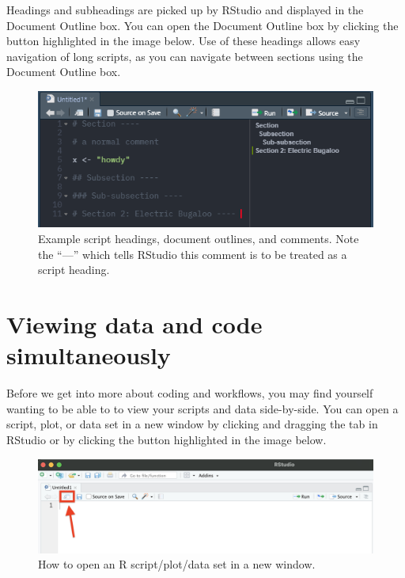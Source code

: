\documentclass[
]{book}
\begin{document}
Headings and subheadings are picked up by RStudio and displayed in the Document Outline box. You can open the Document Outline box by clicking the button highlighted in the image below. Use of these headings allows easy navigation of long scripts, as you can navigate between sections using the Document Outline box.

\begin{figure}
\centering
\includegraphics[width=1\textwidth,height=\textheight]{images/Rstudio_documentoutline2.png}
\caption{Example script headings, document outlines, and comments. Note the ``---'' which tells RStudio this comment is to be treated as a script heading.}
\end{figure}

\hypertarget{viewing-data-and-code-simultaneously}{%
\section{Viewing data and code simultaneously}\label{viewing-data-and-code-simultaneously}}

Before we get into more about coding and workflows, you may find yourself wanting to be able to to view your scripts and data side-by-side. You can open a script, plot, or data set in a new window by clicking and dragging the tab in RStudio or by clicking the button highlighted in the image below.

\begin{figure}
\centering
\includegraphics[width=1\textwidth,height=\textheight]{images/Rstudio_newwindow.png}
\caption{How to open an R script/plot/data set in a new window.}
\end{figure}
\end{document}
